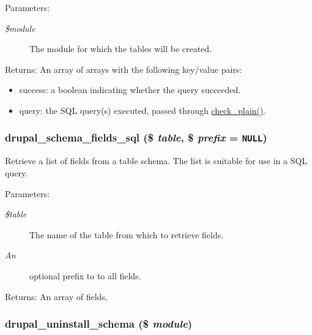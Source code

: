 \begin{Desc}
\item[Parameters:]
\begin{description}
\item[{\em \$module}]The module for which the tables will be created. \end{description}
\end{Desc}
\begin{Desc}
\item[Returns:]An array of arrays with the following key/value pairs:\begin{itemize}
\item success: a boolean indicating whether the query succeeded.\item query: the SQL query(s) executed, passed through \hyperlink{bootstrap_8inc_76fc67a30fd8d75ddd80565e6e65a13d}{check\_\-plain()}. \end{itemize}
\end{Desc}
\hypertarget{group__schemaapi_gacfcd6f676ee9062f0ba50a008a05443}{
\subsubsection[{drupal\_\-schema\_\-fields\_\-sql}]{\setlength{\rightskip}{0pt plus 5cm}drupal\_\-schema\_\-fields\_\-sql (\$ {\em table}, \/  \$ {\em prefix} = {\tt NULL})}}
\label{group__schemaapi_gacfcd6f676ee9062f0ba50a008a05443}


Retrieve a list of fields from a table schema. The list is suitable for use in a SQL query.

\begin{Desc}
\item[Parameters:]
\begin{description}
\item[{\em \$table}]The name of the table from which to retrieve fields. \item[{\em An}]optional prefix to to all fields.\end{description}
\end{Desc}
\begin{Desc}
\item[Returns:]An array of fields. \end{Desc}
\hypertarget{group__schemaapi_g0688b6627af9dc05f2618f81489c3db0}{
\subsubsection[{drupal\_\-uninstall\_\-schema}]{\setlength{\rightskip}{0pt plus 5cm}drupal\_\-uninstall\_\-schema (\$ {\em module})}}
\label{group__schemaapi_g0688b6627af9dc05f2618f81489c3db0}



